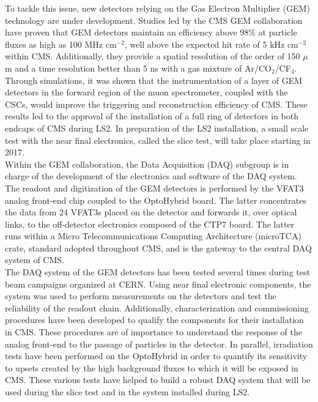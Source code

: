   To tackle this issue, new detectors relying on the Gas Electron Multiplier (GEM) technology are under development. Studies led by the CMS GEM collaboration have proven that GEM detectors maintain an efficiency above 98\% at particle fluxes as high as 100 MHz cm$^{-2}$, well above the expected hit rate of 5 kHz cm$^{-2}$ within CMS. Additionally, they provide a spatial resolution of the order of 150 $\mu$m and a time resolution better than 5 ns with a gas mixture of Ar/CO$_2$/CF$_4$. Through simulations, it was shown that the instrumentation of a layer of GEM detectors in the forward region of the muon spectrometer, coupled with the CSCs, would improve the triggering and reconstruction efficiency of CMS. These results led to the approval of the installation of a full ring of detectors in both endcaps of CMS during LS2. In preparation of the LS2 installation, a small scale test with the near final electronics, called the slice test, will take place starting in 2017. \\

  Within the GEM collaboration, the Data Acquisition (DAQ) subgroup is in charge of the development of the electronics and software of the DAQ system. The readout and digitization of the GEM detectors is performed by the VFAT3 analog front-end chip coupled to the OptoHybrid board. The latter concentrates the data from 24 VFAT3s placed on the detector and forwards it, over optical links, to the off-detector electronics composed of the CTP7 board. The latter runs within a Micro Telecommunications Computing Architecture (microTCA) crate, standard adopted throughout CMS, and is the gateway to the central DAQ system of CMS. \\

  The DAQ system of the GEM detectors has been tested several times during test beam campaigns organized at CERN. Using near final electronic components, the system was used to perform measurements on the detectors and test the reliability of the readout chain. Additionally, characterization and commissioning procedures have been developed to qualify the components for their installation in CMS. These procedures are of importance to understand the response of the analog front-end to the passage of particles in the detector. In parallel, irradiation tests have been performed on the OptoHybrid in order to quantify its sensitivity to upsets created by the high background fluxes to which it will be exposed in CMS. These various tests have helped to build a robust DAQ system that will be used during the slice test and in the system installed during LS2. \\


